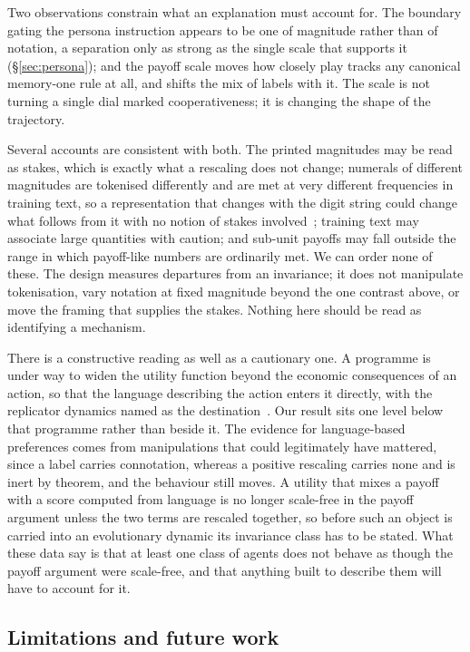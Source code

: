 \documentclass[openacc]{rsproca_new}
\begin{document}
Two observations constrain what an explanation must account for. The boundary
gating the persona instruction appears to be one of magnitude rather than of
notation, a separation only as strong as the single scale that supports it
(\S\ref{sec:persona}); and the payoff scale moves how closely play tracks any
canonical memory-one rule at all, and shifts the mix of labels with it. The
scale is not turning a single dial marked cooperativeness; it is changing the
shape of the trajectory.

Several accounts are consistent with both. The printed magnitudes may be read
as stakes, which is exactly what a rescaling does not change; numerals of
different magnitudes are tokenised differently and are met at very different
frequencies in training text, so a representation that changes with the digit
string could change what follows from it with no notion of stakes
involved~\cite{razeghi2022impact}; training text may associate large quantities
with caution; and sub-unit payoffs may fall outside the range in which
payoff-like numbers are ordinarily met. We can order none of these. The design
measures departures from an invariance; it does not manipulate tokenisation,
vary notation at fixed magnitude beyond the one contrast above, or move the
framing that supplies the stakes. Nothing here should be read as identifying a
mechanism.

There is a constructive reading as well as a cautionary one. A programme is
under way to widen the utility function beyond the economic consequences of an
action, so that the language describing the action enters it directly, with the
replicator dynamics named as the destination~\cite{capraro2024language}. Our
result sits one level below that programme rather than beside it. The evidence
for language-based preferences comes from manipulations that could legitimately
have mattered, since a label carries connotation, whereas a positive rescaling
carries none and is inert by theorem, and the behaviour still moves. A utility
that mixes a payoff with a score computed from language is no longer scale-free
in the payoff argument unless the two terms are rescaled together, so before
such an object is carried into an evolutionary dynamic its invariance class has
to be stated. What these data say is that at least one class of agents does not
behave as though the payoff argument were scale-free, and that anything built
to describe them will have to account for it.

\subsection{Limitations and future work}\label{sec:disc_limitations}
\end{document}
